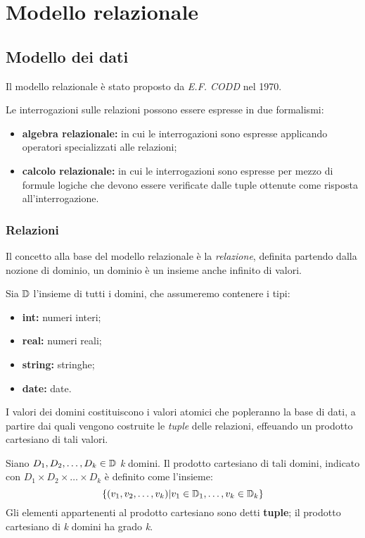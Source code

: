 \chapter{Modello relazionale}%
\label{cha:Modello relazionale}

\section{Modello dei dati}%
\label{sec:Modello dei dati}
Il modello relazionale è stato proposto da \emph{E.F. CODD} nel 1970.

Le interrogazioni sulle relazioni possono essere espresse in due formalismi:
\begin{itemize}
  \item \textbf{algebra relazionale:} in cui le interrogazioni sono espresse
    applicando operatori specializzati alle relazioni;
  \item \textbf{calcolo relazionale:} in cui le interrogazioni sono espresse per
    mezzo di formule logiche che devono essere verificate dalle tuple ottenute
    come risposta all'interrogazione.
\end{itemize}

\subsection{Relazioni}%
\label{sub:Relazioni}
Il concetto alla base del modello relazionale è la \textit{relazione}, definita
partendo dalla nozione di dominio, un dominio è un insieme anche infinito di
valori.

Sia $\mathbb{D}$ l'insieme di tutti i domini, che assumeremo contenere i tipi:
\begin{itemize}
  \item \textbf{int:} numeri interi;
  \item \textbf{real:} numeri reali;
  \item \textbf{string:} stringhe;
  \item \textbf{date:} date.
\end{itemize}

I valori dei domini costituiscono i valori atomici che popleranno la base di
dati, a partire dai quali vengono costruite le \emph{tuple} delle relazioni,
effeuando un prodotto cartesiano di tali valori.

\begin{definizione}
Siano $D_1,D_2,\dots,D_k\in\mathbb{D}$ \emph{k} domini.
Il prodotto cartesiano di tali domini, indicato con $D_1\times
D_2\times\dots\times D_k$ è definito come l'insieme:
\[
  \{(v_1,v_2,\dots,v_k)|v_1\in\mathbb{D}_1,\dots,v_k\in\mathbb{D}_k\}
\]
Gli elementi appartenenti al prodotto cartesiano sono detti \textbf{tuple}; il
prodotto cartesiano di \emph{k} domini ha grado \emph{k}.
\end{definizione}

